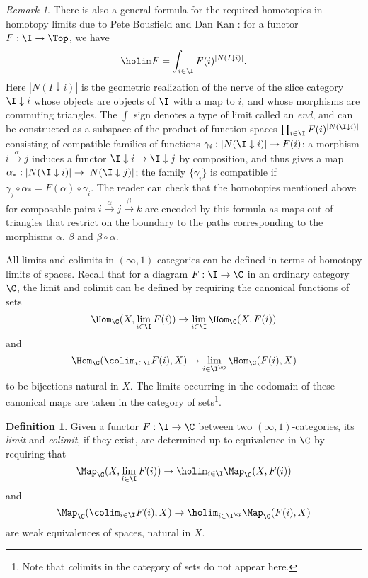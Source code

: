 \documentclass{conm-p-l}
\theoremstyle{definition} \newtheorem{definition}[theorem]{Definition}
\theoremstyle{remark} \newtheorem{remark}[theorem]{Remark}
\numberwithin{equation}{section}
\newcommand{\oo}{\infty}
\newcommand{\io}{$(\oo,1)$}
\newcommand{\abs}[1]{\left|#1\right|}
\begin{document}
\begin{remark}
  There is also a general formula for the required homotopies in
  homotopy limits due to Pete Bousfield and Dan Kan
  \cite{BousfieldKan}: for a functor $F : \I \to \Top$, we have
  \[\holim F = \int_{i\in\I} F(i)^{\abs{N(I\downarrow i)}}.\] Here
  $\abs{N(I\downarrow i)}$ is the geometric realization of the nerve
  of the slice category $\I \downarrow i$ whose objects are objects of
  $\I$ with a map to $i$, and whose morphisms are commuting triangles.
  The $\int$ sign denotes a type of limit called an \emph{end}, and
  can be constructed as a subspace of the product of function spaces
  $\prod_{i \in \I} F(i)^{\abs{N(\I\downarrow i)}}$ consisting of
  compatible families of functions $\gamma_i :\abs{N(\I\downarrow i)}
  \to F(i)$: a morphism $i \xrightarrow{\alpha} j$ induces a functor
  $\I\downarrow i \to \I\downarrow j$ by composition, and thus gives a
  map $\alpha_* : \abs{N(\I\downarrow i)} \to \abs{N(\I\downarrow
    j)}$; the family $\{\gamma_i\}$ is compatible if $\gamma_j \circ
  \alpha_* = F(\alpha) \circ \gamma_i$. The reader can check that the
  homotopies mentioned above for composable pairs
  $i\xrightarrow{\alpha} j\xrightarrow{\beta} k$ are encoded by this
  formula as maps out of triangles that restrict on the boundary to
  the paths corresponding to the morphisms $\alpha$, $\beta$ and
  $\beta \circ \alpha$.
\end{remark}

All limits and colimits in \io-categories can be defined in terms of
homotopy limits of spaces. Recall that for a diagram $F : \I \to \C$
in an ordinary category $\C$, the limit and colimit can be defined by
requiring the canonical functions of sets
\[\Hom_\C(X,\lim_{i\in\I} F(i)) \to \lim_{i\in\I} \Hom_\C(X,F(i))\] and
\[\Hom_\C(\colim_{i\in\I} F(i),X) \to \lim_{i\in\I^{\op}}
  \Hom_\C(F(i),X)\]
to be bijections natural in $X$. The limits occurring in the codomain
of these canonical maps are taken in the category of
sets\footnote{Note that \emph{co}limits in the category of sets do not
  appear here.}.

\begin{definition}
  Given a functor $F : \I \to \C$ between two \io-categories, its
  \emph{limit} and \emph{colimit}, if they exist, are determined
  up to equivalence in $\C$ by requiring that
  \[\Map_\C(X,\lim_{i\in\I} F(i)) \to \holim_{i\in\I} \Map_\C(X,F(i))\] and
  \[\Map_\C(\colim_{i\in\I} F(i),X) \to \holim_{i\in\I^{\op}} \Map_\C(F(i),X)\]
  are weak equivalences of spaces, natural in $X$.
\end{definition}
\end{document}
